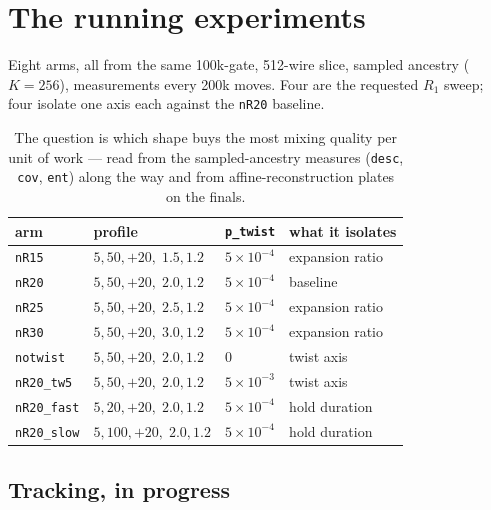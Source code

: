 \documentclass[11pt]{article}
\newcommand{\code}[1]{\texttt{#1}}
\begin{document}
\section{The running experiments}

Eight arms, all from the same 100k-gate, 512-wire slice, sampled ancestry
($K = 256$), measurements every 200k moves. Four are the requested $R_1$
sweep; four isolate one axis each against the \code{nR20} baseline.

\begin{table}[h]\centering\small
\begin{tabular}{llll}
\toprule
arm & profile & \code{p\_twist} & what it isolates \\
\midrule
\code{nR15} & $5,50,+20,\;1.5,1.2$ & $5\!\times\!10^{-4}$ & expansion ratio \\
\code{nR20} & $5,50,+20,\;2.0,1.2$ & $5\!\times\!10^{-4}$ & baseline \\
\code{nR25} & $5,50,+20,\;2.5,1.2$ & $5\!\times\!10^{-4}$ & expansion ratio \\
\code{nR30} & $5,50,+20,\;3.0,1.2$ & $5\!\times\!10^{-4}$ & expansion ratio \\
\code{notwist} & $5,50,+20,\;2.0,1.2$ & $0$ & twist axis \\
\code{nR20\_tw5} & $5,50,+20,\;2.0,1.2$ & $5\!\times\!10^{-3}$ & twist axis \\
\code{nR20\_fast} & $5,20,+20,\;2.0,1.2$ & $5\!\times\!10^{-4}$ & hold duration \\
\code{nR20\_slow} & $5,100,+20,\;2.0,1.2$ & $5\!\times\!10^{-4}$ & hold duration \\
\bottomrule
\end{tabular}
\caption{The question is which shape buys the most mixing quality per unit
of work --- read from the sampled-ancestry measures (\code{desc},
\code{cov}, \code{ent}) along the way and from affine-reconstruction plates
on the finals.}
\end{table}

\subsection{Tracking, in progress}
\end{document}
